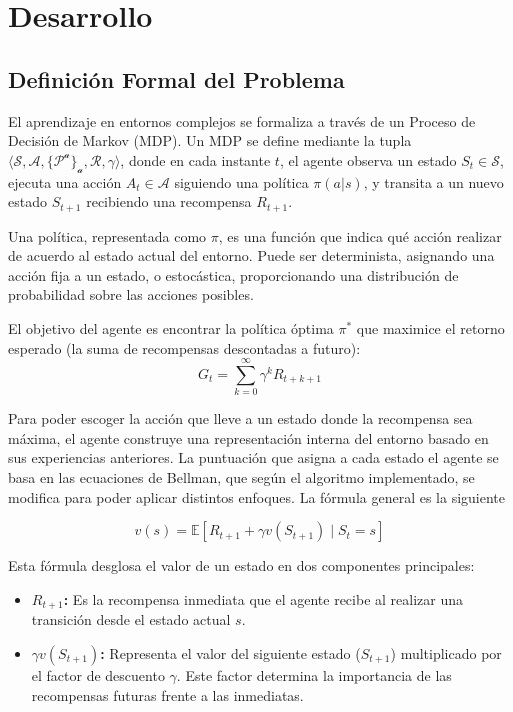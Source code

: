 \section{Desarrollo}

\subsection{Definición Formal del Problema}

El aprendizaje en entornos complejos se formaliza a través de un Proceso de Decisión de Markov (MDP). Un MDP se define mediante la tupla $\langle \mathcal{S}, \mathcal{A}, \mathcal{\{{P^a}\}_a}, \mathcal{R}, \gamma \rangle$, donde en cada instante $t$, el agente observa un estado $S_t \in \mathcal{S}$, ejecuta una acción $A_t \in \mathcal{A}$ siguiendo una política $\pi(a|s)$, y transita a un nuevo estado $S_{t+1}$ recibiendo una recompensa $R_{t+1}$.

\begin{definition}[Política]
Una política, representada como $\pi$, es una función que indica qué acción realizar de acuerdo al estado actual del entorno. Puede ser determinista, asignando una acción fija a un estado, o estocástica, proporcionando una distribución de probabilidad sobre las acciones posibles.
\end{definition}

El objetivo del agente es encontrar la política óptima $\pi^*$ que maximice el retorno esperado (la suma de recompensas descontadas a futuro):
\begin{equation}
    G_t = \sum_{k=0}^{\infty} \gamma^k R_{t+k+1}
\end{equation}

Para poder escoger la acción que lleve a un estado donde la recompensa sea máxima, el agente construye una representación interna del entorno basado en sus experiencias anteriores. La puntuación que asigna a cada estado el agente se basa en las ecuaciones de Bellman, que según el algoritmo implementado, se modifica para poder aplicar distintos enfoques. La fórmula general es la siguiente

\begin{equation}
    v(s) = \mathbb{E}[R_{t+1} + \gamma v(S_{t+1}) \mid S_t = s]
\end{equation}

Esta fórmula desglosa el valor de un estado en dos componentes principales:
\begin{itemize}
    \item \textbf{$R_{t+1}$:} Es la recompensa inmediata que el agente recibe al realizar una transición desde el estado actual $s$.
    \item \textbf{$\gamma v(S_{t+1})$:} Representa el valor del siguiente estado ($S_{t+1}$) multiplicado por el factor de descuento $\gamma$. Este factor determina la importancia de las recompensas futuras frente a las inmediatas.
\end{itemize}

